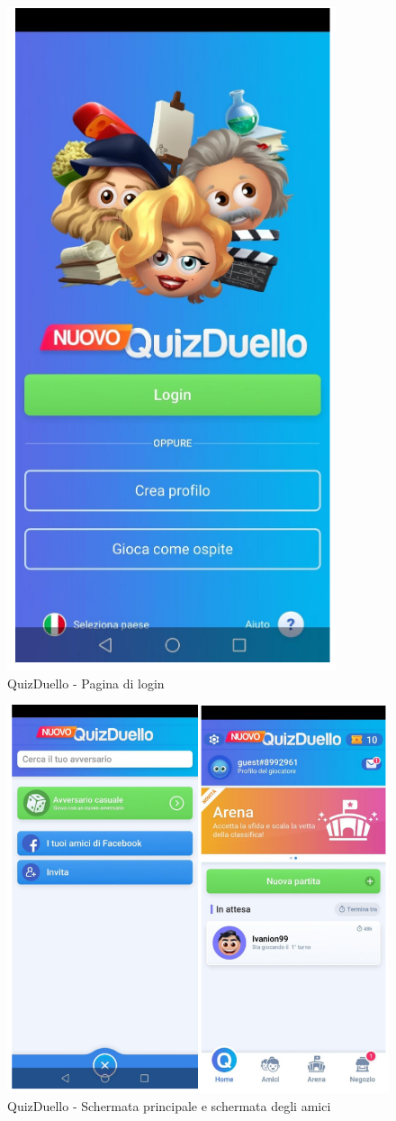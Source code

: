 \documentclass{article}
\begin{document}
\begin{figure}[htp]
\begin{center}
\includegraphics[width=0.5 \textwidth]{Figure21.png}
\caption{QuizDuello - Pagina di login}
\end{center}
\end{figure}

\begin{figure}[htp]
\begin{center}
\includegraphics[width=1 \textwidth]{Figure22.png}
\caption{QuizDuello - Schermata principale e schermata degli amici}
\end{center}
\end{figure}
\end{document}
